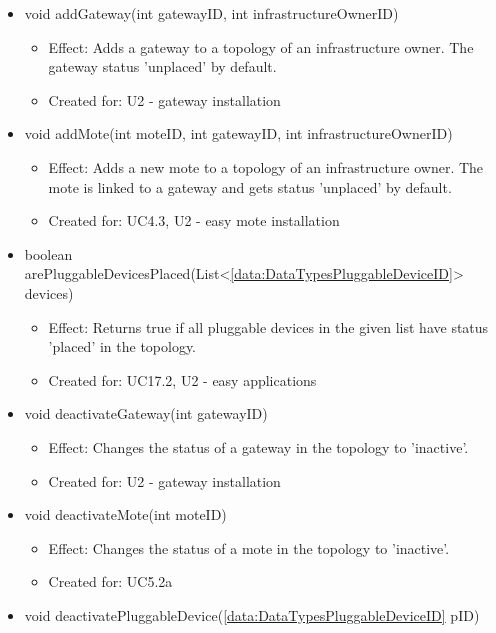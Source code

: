 \begin{description}
\begin{itemize}[noitemsep,nolistsep,leftmargin=-.25cm]
\begin{itemize}
        \end{itemize}
      \item \textsf{void addGateway(int gatewayID, int infrastructureOwnerID)}
        \begin{itemize}[noitemsep,nolistsep]
           \item Effect: Adds a gateway to a topology of an infrastructure owner. The gateway status 'unplaced' by default.
\item Created for: U2 - gateway installation
        \end{itemize}
      \item \textsf{void addMote(int moteID, int gatewayID, int infrastructureOwnerID)}
        \begin{itemize}[noitemsep,nolistsep]
           \item Effect: Adds a new mote to a topology of an infrastructure owner. The mote is linked to a gateway and gets status 'unplaced' by default.
\item Created for: UC4.3, U2 - easy mote installation
        \end{itemize}
      \item \textsf{boolean arePluggableDevicesPlaced(List\textless{}\ref{data:DataTypesPluggableDeviceID}\textgreater{} devices)}
        \begin{itemize}[noitemsep,nolistsep]
           \item Effect: Returns true if all pluggable devices in the given list have status 'placed' in the topology.
\item Created for: UC17.2, U2 - easy applications
        \end{itemize}
      \item \textsf{void deactivateGateway(int gatewayID)}
        \begin{itemize}[noitemsep,nolistsep]
           \item Effect: Changes the status of a gateway in the topology to 'inactive'.
\item Created for: U2 - gateway installation
        \end{itemize}
      \item \textsf{void deactivateMote(int moteID)}
        \begin{itemize}[noitemsep,nolistsep]
           \item Effect: Changes the status of a mote in the topology to 'inactive'.
\item Created for: UC5.2a
        \end{itemize}
      \item \textsf{void deactivatePluggableDevice(\ref{data:DataTypesPluggableDeviceID} pID)}

\end{itemize}
\end{description}
